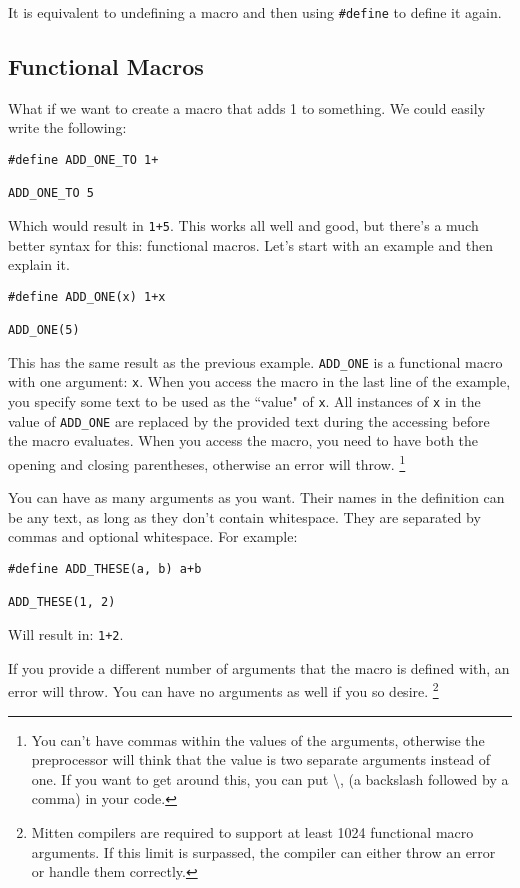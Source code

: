 \documentclass[10pt,a4paper]{article}
\begin{document}
It is equivalent to undefining a macro and then using \verb|#define| to define it again.

\newpage





\subsection{Functional Macros}
What if we want to create a macro that adds 1 to something. We could easily write the following:
\begin{verbatim}
#define ADD_ONE_TO 1+

ADD_ONE_TO 5
\end{verbatim}

Which would result in \verb|1+5|. This works all well and good, but there's a much better syntax for this: functional macros. Let's start with an example and then explain it.
\begin{verbatim}
#define ADD_ONE(x) 1+x

ADD_ONE(5)
\end{verbatim}

This has the same result as the previous example. \verb|ADD_ONE| is a functional macro with one argument: \verb|x|. When you access the macro in the last line of the example, you specify some text to be used as the ``value" of \verb|x|. All instances of \verb|x| in the value of \verb|ADD_ONE| are replaced by the provided text during the accessing before the macro evaluates. When you access the macro, you need to have both the opening and closing parentheses, otherwise an error will throw. \footnote{You can't have commas within the values of the arguments, otherwise the preprocessor will think that the value is two separate arguments instead of one. If you want to get around this, you can put \textbackslash, (a backslash followed by a comma) in your code.}

You can have as many arguments as you want. Their names in the definition can be any text, as long as they don't contain whitespace. They are separated by commas and optional whitespace. For example:
\begin{verbatim}
#define ADD_THESE(a, b) a+b

ADD_THESE(1, 2)
\end{verbatim}
Will result in: \verb|1+2|.

If you provide a different number of arguments that the macro is defined with, an error will throw. You can have no arguments as well if you so desire. \footnote{Mitten compilers are required to support at least 1024 functional macro arguments. If this limit is surpassed, the compiler can either throw an error or handle them correctly.}
\end{document}

